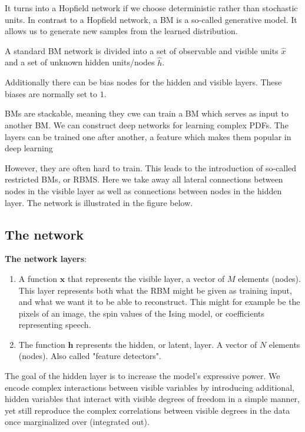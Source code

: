 \documentclass[%
oneside,                 %
final,                   %
10pt]{article}
\begin{document}
It turns into a Hopfield network if we choose deterministic rather
than stochastic units. In contrast to a Hopfield network, a BM is a
so-called generative model. It allows us to generate new samples from
the learned distribution.

A standard BM network is divided into a set of observable and visible units $\hat{x}$ and a set of unknown hidden units/nodes $\hat{h}$.

Additionally there can be bias nodes for the hidden and visible layers. These biases are normally set to $1$.

BMs are stackable, meaning they cwe can train a BM which serves as input to another BM. We can construct deep networks for learning complex PDFs. The layers can be trained one after another, a feature which makes them popular in deep learning

However, they are often hard to train. This leads to the introduction of so-called restricted BMs, or RBMS.
Here we take away all lateral connections between nodes in the visible layer as well as connections between nodes in the hidden layer. The network is illustrated in the figure below.

\subsection*{The network}

\textbf{The network layers}:
\begin{enumerate}
 \item A function $\mathbf{x}$ that represents the visible layer, a vector of $M$ elements (nodes). This layer represents both what the RBM might be given as training input, and what we want it to be able to reconstruct. This might for example be the pixels of an image, the spin values of the Ising model, or coefficients representing speech.

 \item The function $\mathbf{h}$ represents the hidden, or latent, layer. A vector of $N$ elements (nodes). Also called "feature detectors".
\end{enumerate}

\noindent
The goal of the hidden layer is to increase the model's expressive power. We encode complex interactions between visible variables by introducing additional, hidden variables that interact with visible degrees of freedom in a simple manner, yet still reproduce the complex correlations between visible degrees in the data once marginalized over (integrated out).
\end{document}
